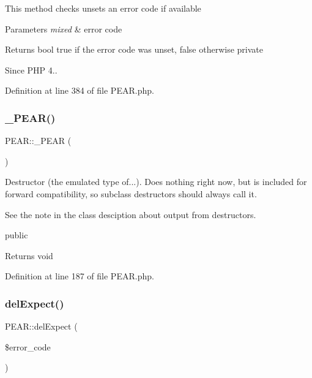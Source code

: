 This method checks unsets an error code if available


\begin{DoxyParams}{Parameters}
{\em mixed} & error code \\
\hline
\end{DoxyParams}
\begin{DoxyReturn}{Returns}
bool true if the error code was unset, false otherwise  private 
\end{DoxyReturn}
\begin{DoxySince}{Since}
P\+HP 4.. 
\end{DoxySince}


Definition at line 384 of file P\+E\+A\+R.\+php.

\mbox{\label{classPEAR_a282c57b5152ef70d02b3f08ad826af0a}} 
\subsubsection{\texorpdfstring{\+\_\+\+P\+E\+A\+R()}{\_PEAR()}}
{\footnotesize\ttfamily P\+E\+A\+R\+::\+\_\+\+P\+E\+AR (\begin{DoxyParamCaption}{ }\end{DoxyParamCaption})}

Destructor (the emulated type of...). Does nothing right now, but is included for forward compatibility, so subclass destructors should always call it.

See the note in the class desciption about output from destructors.

public \begin{DoxyReturn}{Returns}
void 
\end{DoxyReturn}


Definition at line 187 of file P\+E\+A\+R.\+php.

\mbox{\label{classPEAR_a8aa91fd0c4d61435587519c0417848c5}} 
\subsubsection{\texorpdfstring{del\+Expect()}{delExpect()}}
{\footnotesize\ttfamily P\+E\+A\+R\+::del\+Expect (\begin{DoxyParamCaption}\item[{}]{\$error\+\_\+code }\end{DoxyParamCaption})}

